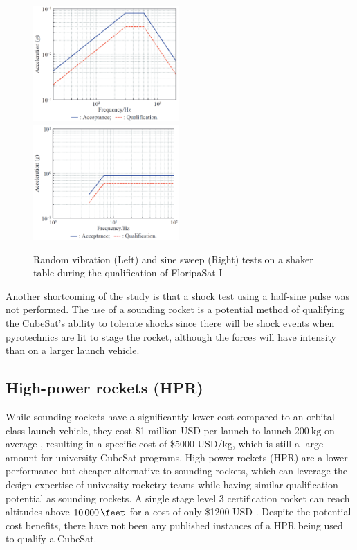 \documentclass[]{report}
\begin{document}
\begin{figure}[H]
  \includegraphics[width=0.495\textwidth]{images/floripa-random-spectrum.png}
  \includegraphics[width=0.495\textwidth]{images/floripa-sinusoid.png}
  \caption{Random vibration (Left) and sine sweep (Right) tests on a shaker table during the qualification of FloripaSat-I \cite{9316404}}
  \label{fig:shaker}
\end{figure}

Another shortcoming of the study is that a shock test using a half-sine pulse was not performed. The use of a sounding rocket is a potential method of qualifying the CubeSat's ability to tolerate shocks since there will be shock events when pyrotechnics are lit to stage the rocket, although the forces will have intensity than on a larger launch vehicle.

\subsection{High-power rockets (HPR)}
While sounding rockets have a significantly lower cost compared to an orbital-class launch vehicle, they cost \$1 million USD per launch to launch $\SI{200}{\kilo\gram}$ on average \cite{jurist2009commercial}, resulting in a specific cost of \$5000 USD/kg, which is still a large amount for university CubeSat programs. High-power rockets (HPR) are a lower-performance but cheaper alternative to sounding rockets, which can leverage the design expertise of university rocketry teams while having similar qualification potential as sounding rockets. A single stage level 3 certification rocket can reach altitudes above $\SI{10000}{\feet}$ \cite{canepa2005modern} for a cost of only \$1200 USD \cite{canepa2005modern}. Despite the potential cost benefits, there have not been any published instances of a HPR being used to qualify a CubeSat.
\end{document}
